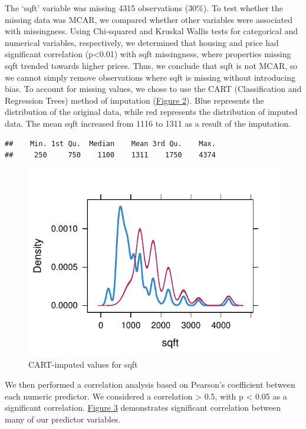 \documentclass[11pt,]{article}
\begin{document}
The `sqft' variable was missing 4315 observations (30\%). To test
whether the missing data was MCAR, we compared whether other variables
were associated with missingness. Using Chi-squared and Kruskal Wallis
tests for categorical and numerical variables, respectively, we
determined that housing and price had significant correlation
(p\textless0.01) with sqft missingness, where properties missing sqft
trended towards higher prices. Thus, we conclude that sqft is not MCAR,
so we cannot simply remove observations where sqft is missing without
introducing bias. To account for missing values, we chose to use the
CART (Classification and Regression Trees) method of imputation
(\hyperref[sec:fig2]{Figure 2}). Blue represents the distribution of the
original data, while red represents the distribution of imputed data.
The mean sqft increased from 1116 to 1311 as a result of the imputation.

\begin{verbatim}
##    Min. 1st Qu.  Median    Mean 3rd Qu.    Max. 
##     250     750    1100    1311    1750    4374
\end{verbatim}

\begin{figure}

{\centering \includegraphics{House_prices_report_files/figure-latex/CART imputation-1} 

}

\caption{CART-imputed values for sqft\label{sec:fig2}}\label{fig:CART imputation}
\end{figure}

We then performed a correlation analysis based on Pearson's coefficient
between each numeric predictor. We considered a correlation
\textgreater{} 0.5, with p \textless{} 0.05 as a significant
correlation. \hyperref[sec:fig3]{Figure 3} demonstrates significant
correlation between many of our predictor variables.
\end{document}
